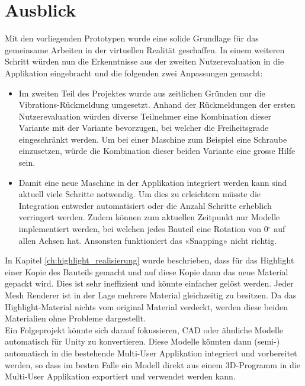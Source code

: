 \chapter{Ausblick}
\label{ch:Ausblick}

Mit den vorliegenden Prototypen wurde eine solide Grundlage für das gemeinsame Arbeiten in der virtuellen Realität geschaffen. In einem weiteren Schritt würden nun die Erkenntnisse aus der zweiten Nutzerevaluation in die Applikation eingebracht und die folgenden zwei Anpassungen gemacht:

\begin{itemize}
	\item Im zweiten Teil des Projektes wurde aus zeitlichen Gründen nur die Vibrations-Rückmeldung umgesetzt. Anhand der Rückmeldungen der ersten Nutzerevaluation würden diverse Teilnehmer eine Kombination dieser Variante mit der Variante bevorzugen, bei welcher die Freiheitsgrade eingeschränkt werden. Um bei einer Maschine zum Beispiel eine Schraube einzusetzen, würde die Kombination dieser beiden Variante eine grosse Hilfe sein.
	
	\item Damit eine neue Maschine in der Applikation integriert werden kann sind aktuell viele Schritte notwendig. Um dies zu erleichtern müsste die Integration entweder automatisiert oder die Anzahl Schritte erheblich verringert werden. Zudem können zum aktuellen Zeitpunkt nur Modelle implementiert werden, bei welchen jedes Bauteil eine Rotation von 0$^{\circ}$ auf allen Achsen hat. Ansonsten funktioniert das «Snapping» nicht richtig.
\end{itemize}

In Kapitel \ref{ch:highlight_realisierung} wurde beschrieben, dass für das Highlight einer Kopie des Bauteils gemacht und auf diese Kopie dann das neue Material gepackt wird. Dies ist sehr ineffizient und könnte einfacher gelöst werden. Jeder \grqq Mesh Renderer\grqq{} ist in der Lage mehrere Material gleichzeitig zu besitzen. Da das Highlight-Material nichts vom original Material verdeckt, werden diese beiden Materialien ohne Probleme dargestellt. \\

\noindent Ein Folgeprojekt könnte sich darauf fokussieren, CAD oder ähnliche Modelle automatisch für Unity zu konvertieren. Diese Modelle könnten dann (semi-) automatisch in die bestehende Multi-User Applikation integriert und vorbereitet werden, so dass im besten Falle ein Modell direkt aus einem 3D-Programm in die Multi-User Applikation exportiert und verwendet werden kann.